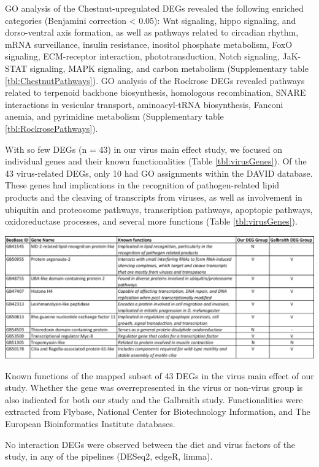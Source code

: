 \documentclass[11pt,a4paper,oldfontcommands,openany]{memoir}
\numberwithin{equation}{section} %
\begin{document}
GO analysis of the Chestnut-upregulated DEGs revealed the following enriched categories (Benjamini correction < 0.05): Wnt signaling, hippo signaling, and dorso-ventral axis formation, as well as pathways related to circadian rhythm, mRNA surveillance, insulin resistance, inositol phosphate metabolism, FoxO signaling, ECM-receptor interaction, phototransduction, Notch signaling, JaK-STAT signaling, MAPK signaling, and carbon metabolism (Supplementary table \ref{tbl:ChestnutPathways}). GO analysis of the Rockrose DEGs revealed pathways related to terpenoid backbone biosynthesis, homologous recombination, SNARE interactions in vesicular transport, aminoacyl-tRNA biosynthesis, Fanconi anemia, and pyrimidine metabolism (Supplementary table \ref{tbl:RockrosePathways}).

With so few DEGs (n = 43) in our virus main effect study, we focused on individual genes and their known functionalities (Table \ref{tbl:virusGenes}). Of the 43 virus-related DEGs, only 10 had GO assignments within the DAVID database. These genes had implications in the recognition of pathogen-related lipid products and the cleaving of transcripts from viruses, as well as involvement in ubiquitin and proteosome pathways, transcription pathways, apoptopic pathways, oxidoreductase processes, and several more functions (Table \ref{tbl:virusGenes}).

\begin{table}[H]
  \includegraphics[width=\textwidth]{Images/virusGenes}
  \caption{Known functions of the mapped subset of 43 DEGs in the virus main effect of our study. Whether the gene was overrepresented in the virus or non-virus group is also indicated for both our study and the Galbraith study. Functionalities were extracted from Flybase, National Center for Biotechnology Information, and The European Bioinformatics Institute databases.}
  \label{tbl:virusGenes}
\end{table}

No interaction DEGs were observed between the diet and virus factors of the study, in any of the pipelines (DESeq2, edgeR, limma).
\end{document}
